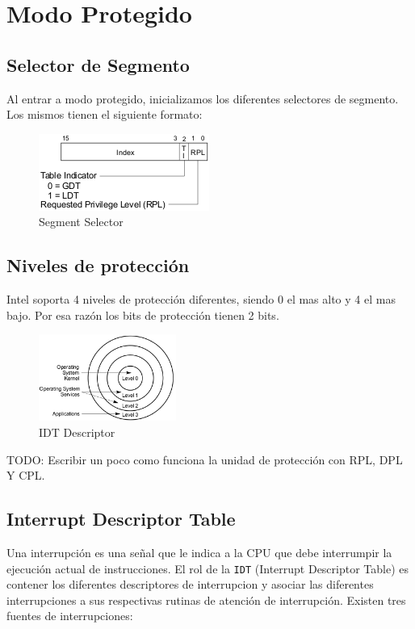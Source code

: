 \section{Modo Protegido}

\subsection{Selector de Segmento}
Al entrar a modo protegido, inicializamos los diferentes selectores de segmento. Los mismos tienen el siguiente formato:

\begin{figure}[h!]
  \centering
    \includegraphics[scale=0.8]{images/segment_selector}
  \caption{Segment Selector}
\end{figure}

\subsection{Niveles de protección}

Intel soporta 4 niveles de protección diferentes, siendo 0 el mas alto y 4 el mas bajo. Por esa razón los bits de protección tienen 2 bits.

\begin{figure}[h!]
  \centering
    \includegraphics[width=0.4\textwidth]{images/protection_rings}
  \caption{IDT Descriptor}
\end{figure}

TODO: Escribir un poco como funciona la unidad de protección con RPL, DPL Y CPL.

\subsection{Interrupt Descriptor Table}

Una interrupción es una señal que le indica a la CPU que debe interrumpir la ejecución actual de instrucciones. El rol de la \texttt{IDT} (Interrupt Descriptor Table) es contener los diferentes descriptores de interrupcion y asociar las diferentes interrupciones a sus respectivas rutinas de atención de interrupción. Existen tres fuentes de interrupciones:

